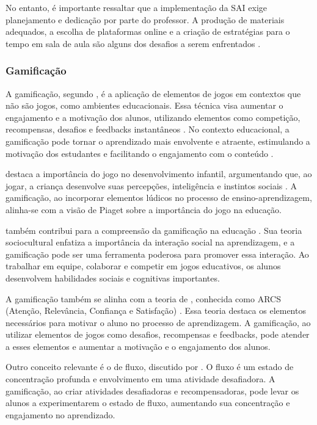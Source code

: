 No entanto, é importante ressaltar que a implementação da SAI exige planejamento e dedicação por parte do professor. A produção de materiais adequados, a escolha de plataformas online e a criação de estratégias para o tempo em sala de aula são alguns dos desafios a serem enfrentados \cite{Rodrigues_2020}.

\subsubsection{Gamificação}

A gamificação, segundo \cite{busarello2014gamificacao}, é a aplicação de elementos de jogos em contextos que não são jogos, como ambientes educacionais. Essa técnica visa aumentar o engajamento e a motivação dos alunos, utilizando elementos como competição, recompensas, desafios e feedbacks instantâneos . No contexto educacional, a gamificação pode tornar o aprendizado mais envolvente e atraente, estimulando a motivação dos estudantes e facilitando o engajamento com o conteúdo \cite{goncalves2021modelo}.

\cite{piaget1993formacao} destaca a importância do jogo no desenvolvimento infantil, argumentando que, ao jogar, a criança desenvolve suas percepções, inteligência e instintos sociais . A gamificação, ao incorporar elementos lúdicos no processo de ensino-aprendizagem, alinha-se com a visão de Piaget sobre a importância do jogo na educação.

\cite{vigotsky2007formacao} também contribui para a compreensão da gamificação na educação . Sua teoria sociocultural enfatiza a importância da interação social na aprendizagem, e a gamificação pode ser uma ferramenta poderosa para promover essa interação. Ao trabalhar em equipe, colaborar e competir em jogos educativos, os alunos desenvolvem habilidades sociais e cognitivas importantes.

A gamificação também se alinha com a teoria de \cite{keller2017development}, conhecida como ARCS (Atenção, Relevância, Confiança e Satisfação) . Essa teoria destaca os elementos necessários para motivar o aluno no processo de aprendizagem. A gamificação, ao utilizar elementos de jogos como desafios, recompensas e feedbacks, pode atender a esses elementos e aumentar a motivação e o engajamento dos alunos.

Outro conceito relevante é o de fluxo, discutido por \cite{hamari2014measuring}. O fluxo é um estado de concentração profunda e envolvimento em uma atividade desafiadora. A gamificação, ao criar atividades desafiadoras e recompensadoras, pode levar os alunos a experimentarem o estado de fluxo, aumentando sua concentração e engajamento no aprendizado.

